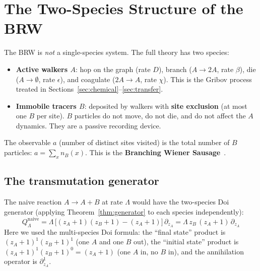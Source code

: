\documentclass[11pt,a4paper]{article}
\theoremstyle{definition}
\begin{document}
\section{The Two-Species Structure of the BRW}
\label{sec:two_species}

The BRW is \emph{not} a single-species system. The full theory has two
species:
\begin{itemize}
\item \textbf{Active walkers $A$}: hop on the graph (rate $D$), branch
      ($A \to 2A$, rate $\beta$), die ($A \to \emptyset$, rate $\epsilon$),
      and coagulate ($2A \to A$, rate $\chi$). This is the Gribov process
      treated in Sections~\ref{sec:chemical}--\ref{sec:transfer}.
\item \textbf{Immobile tracers $B$}: deposited by walkers with
      \textbf{site exclusion} (at most one $B$ per site). $B$ particles
      do not move, do not die, and do not affect the $A$ dynamics. They
      are a passive recording device.
\end{itemize}

The observable $a$ (number of distinct sites visited) is the total number
of $B$ particles: $a = \sum_x n_B(x)$. This is the \textbf{Branching
Wiener Sausage}~\cite{nekovar2016}.

\subsection{The transmutation generator}

The naive reaction $A \to A + B$ at rate $\Lambda$ would have the
two-species Doi generator (applying Theorem~\ref{thm:generator} to each
species independently):
\begin{equation}
Q_\Lambda^{\text{naive}} = \Lambda\, \bigl[(z_A{+}1)(z_B{+}1) - (z_A{+}1)\bigr]\,\partial_{z_A}
= \Lambda\, z_B\, (z_A{+}1)\, \partial_{z_A}
\label{eq:Q_transmute_naive}
\end{equation}
Here we used the multi-species Doi formula: the ``final state'' product
is $(z_A{+}1)^1(z_B{+}1)^1$ (one $A$ and one $B$ out), the ``initial state''
product is $(z_A{+}1)^1(z_B{+}1)^0 = (z_A{+}1)$ (one $A$ in, no $B$ in),
and the annihilation operator is $\partial_{z_A}^1$.
\end{document}
